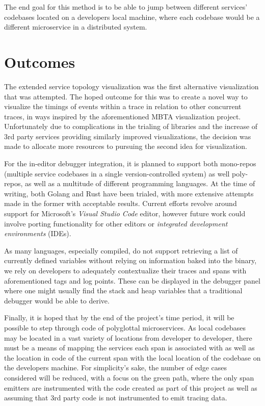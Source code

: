 \documentclass[pdftex,titlepage]{article}
\begin{document}
        The end goal for this method is to be able to jump between different services' codebases located on a developers local machine,
        where each codebase would be a different microservice in a distributed system. 

    \newpage

    \section{Outcomes}

    The extended service topology visualization was the first alternative visualization that was attempted. The hoped outcome for this was 
    to create a novel way to visualize the timings of events within a trace in relation to other concurrent traces, in ways inspired by 
    the aforementioned MBTA visualization  project. Unfortunately due to complications in the trialing of libraries and the increase of 
    3rd party services providing similarly improved visualizations\cite{risingstacktopo}\cite{kialitopo}, the decision was made to allocate
    more resources to pursuing the second idea for visualization.

    For the in-editor debugger integration, it is planned to support both mono-repos (multiple service codebases in a single version-controlled
    system) as well poly-repos, as well as a multitude of different programming languages. At the time of writing, both Golang and Rust have been
    trialed, with more extensive attempts made in the former with acceptable results. Current efforts revolve around support for Microsoft's
    \textit{Visual Studio Code} editor, however future work could involve porting functionality for other editors or \textit{integrated development
    environments} (IDEs).

    As many languages, especially compiled, do not support retrieving a list of currently defined variables without relying on information baked
    into the binary, we rely on developers to adequately contextualize their traces and spans with aforementioned tags and log points. These 
    can be displayed in the debugger panel where one might usually find the stack and heap variables that a traditional debugger would be able
    to derive.

    Finally, it is hoped that by the end of the project's time period, it will be possible to step through code of polyglottal 
    microservices\cite{polyglot}. As local codebases may be located in a vast variety of locations from developer to developer, there must be a
    means of mapping the services each span is associated with as well as the location in code of the current span with the local location of 
    the codebase on the developers machine. For simplicity's sake, the number of edge cases considered will be reduced, with a focus on the 
    green path, where the only span emitters are instrumented with the code created as part of this project as well as assuming that 3rd party
    code is not instrumented to emit tracing data.
\end{document}
